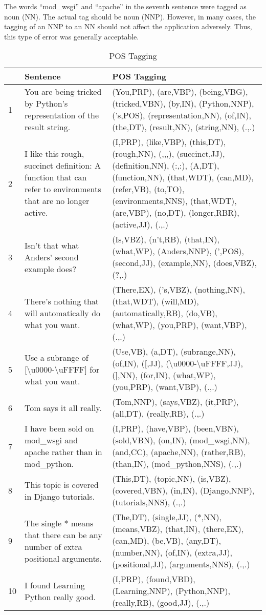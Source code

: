 The words ``mod\_wsgi'' and ``apache'' in the seventh sentence were tagged as
noun (NN). The actual tag should be noun (NNP). However, in many cases, the
tagging of an NNP to an NN should not affect the application adversely. Thus,
this type of error was generally acceptable.

\begin{table}
\caption{POS Tagging}\label{pos}
\begin{tabu}{X[0.1,c]X[1,l]X[2,l]}
    & \textbf{Sentence} & \textbf{POS Tagging} \\
     & You are being tricked by Python's representation of the result
    string. &
    (You,PRP), (are,VBP), (being,VBG), (tricked,VBN), (by,IN), (Python,NNP),
    ('s,POS), (representation,NN), (of,IN), (the,DT), (result,NN), 
    (string,NN), (.,.) \\
    2 & I like this rough, succinct definition: A function that can refer to 
    environments that are no longer active. &
    (I,PRP), (like,VBP), (this,DT), (rough,NN), (,,,), (succinct,JJ),
    (definition,NN), (:,:), (A,DT), (function,NN), (that,WDT), (can,MD),
    (refer,VB), (to,TO), (environments,NNS), (that,WDT), (are,VBP), (no,DT),
    (longer,RBR), (active,JJ), (.,.) \\
    3 & Isn't that what Anders' second example does? &
    (Is,VBZ), (n't,RB), (that,IN), (what,WP), (Anders,NNP), (',POS),
    (second,JJ), (example,NN), (does,VBZ), (?,.) \\
    4 & There's nothing that will automatically do what you want. & 
    (There,EX), ('s,VBZ), (nothing,NN), (that,WDT), (will,MD),
    (automatically,RB), (do,VB), (what,WP), (you,PRP), (want,VBP), (.,.) \\
    5 & Use a subrange of [\textbackslash{}u0000-\textbackslash{}uFFFF] for
    what you want. & 
    (Use,VB), (a,DT), (subrange,NN), (of,IN), ([,JJ),
    (\textbackslash{}u0000-\textbackslash{}uFFFF,JJ), (],NN),
    (for,IN), (what,WP), (you,PRP), (want,VBP), (.,.) \\
    6 & Tom says it all really. &
    (Tom,NNP), (says,VBZ), (it,PRP), (all,DT), (really,RB), (.,.) \\
    7 & I have been sold on mod\_wsgi and apache rather than in mod\_python. &
    (I,PRP), (have,VBP), (been,VBN), (sold,VBN), (on,IN), (mod\_wsgi,NN),
    (and,CC), (apache,NN), (rather,RB), (than,IN), (mod\_python,NNS), (.,.) \\
    8 & This topic is covered in Django tutorials. &
    (This,DT), (topic,NN), (is,VBZ), (covered,VBN), (in,IN), (Django,NNP),
    (tutorials,NNS), (.,.) \\
    9 & The single * means that there can be any number of extra positional
    arguments. &
    (The,DT), (single,JJ), (*,NN), (means,VBZ), (that,IN), (there,EX), (can,MD),
    (be,VB), (any,DT), (number,NN), (of,IN), (extra,JJ), (positional,JJ),
    (arguments,NNS), (.,.) \\
    10 & I found Learning Python really good. &
    (I,PRP), (found,VBD), (Learning,NNP), (Python,NNP), (really,RB), (good,JJ),
    (.,.) \\    
\end{tabu} 
\end{table}

